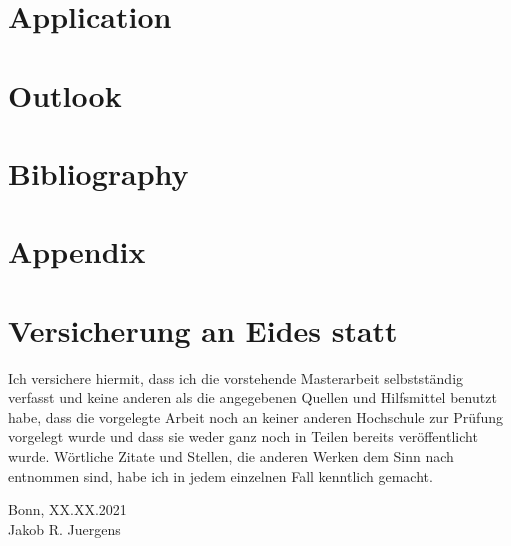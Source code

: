\documentclass[11pt,twoside,a4paper]{article}
\theoremstyle{assumpstyle} \newtheorem{assumption}{Assumption}
\theoremstyle{assumpstyle} \newtheorem{definition}{Definition}
\begin{document}
	\section{Application}
	
	\section{Outlook}
	
	\newpage
	\section{Bibliography}
	\printbibliography[heading=none]
	
	\newpage
	\section{Appendix}
	
	\newpage
	
	\section{Versicherung an Eides statt}	
	
		\vspace{3cm}
		
		Ich versichere hiermit, dass ich die vorstehende Masterarbeit
		selbstständig verfasst und keine anderen als die angegebenen Quellen
		und Hilfsmittel benutzt habe, dass die vorgelegte Arbeit noch an keiner
		anderen Hochschule zur Prüfung vorgelegt wurde und dass sie weder
		ganz noch in Teilen bereits veröffentlicht wurde. Wörtliche Zitate und
		Stellen, die anderen Werken dem Sinn nach entnommen sind, habe ich
		in jedem einzelnen Fall kenntlich gemacht.
		
		\vspace{2cm}
		Bonn, XX.XX.2021 \hrulefill \\
		\hspace*{0mm}Jakob R. Juergens
		
		\vspace{\fill}
\end{document}
